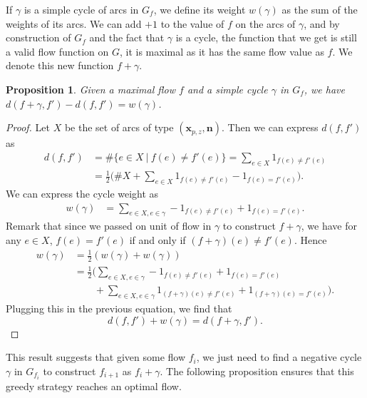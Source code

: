 \documentclass[]{article}
\newtheorem{proposition}{Proposition}
\begin{document}
If $\gamma$ is a simple cycle of arcs in $G_f$, we define its weight $w(\gamma)$ as the sum of the weights of its arcs. We can add $+1$ to the value of $f$ on the arcs of $\gamma$, and by construction of $G_f$ and the fact that $\gamma$ is a cycle, the function that we get is still a valid flow function on $G$, it is maximal as it has the same flow value as $f$. We denote this new function $f+\gamma$.

\begin{proposition}
	Given a maximal flow $f$ and a simple cycle $\gamma$ in $G_f$, we have $d(f+\gamma, f') - d(f,f') = w(\gamma)$.
\end{proposition}
\begin{proof}
	Let $X$ be the set of arcs of type $(\mathbf{x}_{p,z},\mathbf{n})$. Then we can express $d(f,f')$ as
	\begin{align*}
		d(f,f') & = \#\{e\in X ~|~ f(e)\neq f'(e)\}
		= \sum_{e\in X} 1_{f(e)\neq f'(e)} \\
		& = \frac{1}{2}\big( \#X + \sum_{e\in X} 1_{f(e)\neq f'(e)} - 1_{f(e)= f'(e)} \big).
	\end{align*}
	We can express the cycle weight as
	\begin{align*}
		w(\gamma) &  = \sum_{e\in X, e\in \gamma} - 1_{f(e)\neq f'(e)} + 1_{f(e)= f'(e)}.
	\end{align*}
	Remark that since we passed on unit of flow in $\gamma$ to construct $f+\gamma$, we have for any $e\in X$, $f(e)=f'(e)$ if and only if $(f+\gamma)(e) \neq f'(e)$.
	Hence
	\begin{align*}
		w(\gamma) &  = \frac{1}{2}(w(\gamma) + w(\gamma)) \\
		&= \frac{1}{2} \Big( 
		\sum_{e\in X, e\in \gamma} - 1_{f(e)\neq f'(e)} +  1_{f(e)= f'(e)} \\
		& \qquad +
		\sum_{e\in X, e\in \gamma} 1_{(f+\gamma)(e)\neq f'(e)} +  1_{(f+\gamma)(e)= f'(e)}
		\Big).
	\end{align*}
	Plugging this in the previous equation, we find that 
	$$d(f,f')+w(\gamma) = d(f+\gamma, f').$$
\end{proof}

This result suggests that given some flow $f_i$, we just need to find a negative cycle $\gamma$ in $G_{f_i}$ to construct $f_{i+1}$ as $f_i+\gamma$. The following proposition ensures that this greedy strategy reaches an optimal flow. 
\end{document}
